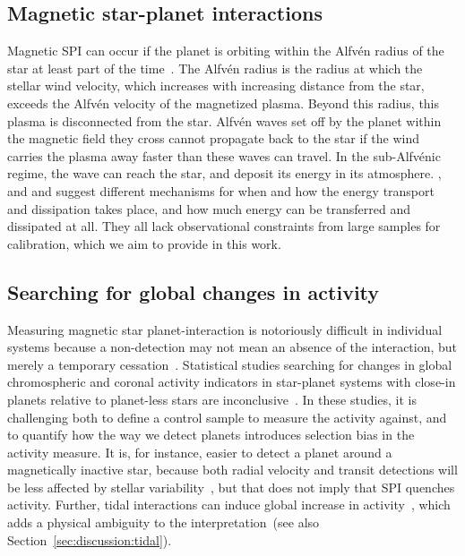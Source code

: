 \documentclass[twocolumn]{aastex631}
\begin{document}
\subsection{Magnetic star-planet interactions}
\label{sec:intro:mspi}
Magnetic SPI can occur if the planet is orbiting within the Alfv\'en radius of the star at least part of the time~\citep{preusse2006magnetic, cohen2011dynamics}. The Alfv\'en radius is the radius at which the stellar wind velocity, which increases with increasing distance from the star, exceeds the Alfv\'en velocity of the magnetized plasma. Beyond this radius, this plasma is disconnected from the star. Alfv\'en waves set off by the planet within the magnetic field they cross cannot propagate back to the star if the wind carries the plasma away faster than these waves can travel. In the sub-Alfv\'enic regime, the wave can reach the star, and deposit its energy in its atmosphere. \citet{lanza2012starplanet, lanza2018closeby}, and \citet{zarka2007plasma} and \citet{saur2013magnetic} suggest different mechanisms for when and how the energy transport and dissipation takes place, and how much energy can be transferred and dissipated at all. They all lack observational constraints from large samples for calibration, which we aim to provide in this work.

\subsection{Searching for global changes in activity}
\label{sec:intro:global}
Measuring magnetic star planet-interaction is notoriously difficult in individual systems because a non-detection may not mean an absence of the interaction, but merely a temporary cessation~\citep{shkolnik2005hot, shkolnik2008nature}. Statistical studies searching for changes in global chromospheric and coronal activity indicators in star-planet systems with close-in planets relative to planet-less stars are inconclusive~\citep{kashyap2008extrasolar,scharf2010possible, shkolnik2013ultraviolet, france2018farultraviolet, viswanath2020statistical, krejcova2012evidence, miller2015comprehensive, poppenhaeger2010coronal}. In these studies, it is challenging both to define a control sample to measure the activity against, and to quantify how the way we detect planets introduces selection bias in the activity measure. It is, for instance, easier to detect a planet around a magnetically inactive star, because both radial velocity and transit detections will be less affected by stellar variability~\citep{poppenhaeger2011correlation}, but that does not imply that SPI quenches activity. Further, tidal interactions can induce global increase in activity~\citep{ilic2022tidal}, which adds a physical ambiguity to the interpretation~(see also Section~\ref{sec:discussion:tidal}). 
\end{document}
